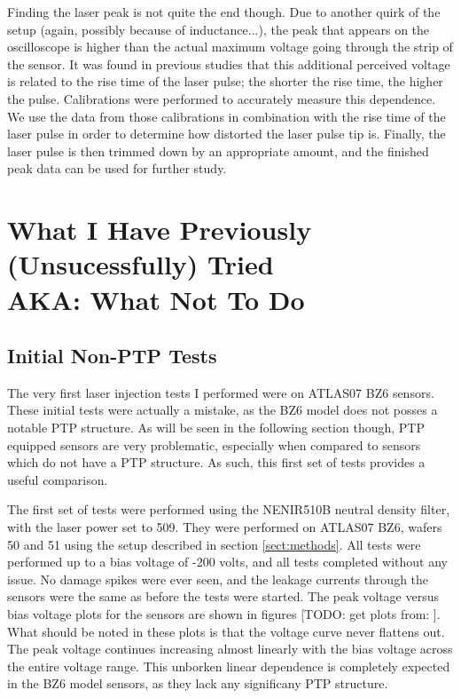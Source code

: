 \documentclass{report}
\begin{document}
            Finding the laser peak is not quite the end though. Due to another quirk of the setup (again, possibly because of inductance...), the peak that appears on the oscilloscope is higher than the actual maximum voltage going through the strip of the sensor. It was found in previous studies that this additional perceived voltage is related to the rise time of the laser pulse; the shorter the rise time, the higher the pulse. Calibrations were performed to accurately measure this dependence. We use the data from those calibrations in combination with the rise time of the laser pulse in order to determine how distorted the laser pulse tip is. Finally, the laser pulse is then trimmed down by an appropriate amount, and the finished peak data can be used for further study.

            



    \chapter{ What I Have Previously (Unsucessfully) Tried\\ AKA: What Not To Do }
        \section{Initial Non-PTP Tests}
            The very first laser injection tests I performed were on ATLAS07 BZ6 sensors. These initial tests were actually a mistake, as the BZ6 model does not posses a notable PTP structure. As will be seen in the following section though, PTP equipped sensors are very problematic, especially when compared to sensors which do not have a PTP structure. As such, this first set of tests provides a useful comparison.

            The first set of tests were performed using the NENIR510B neutral density filter, with the laser power set to 509. They were performed on ATLAS07 BZ6, wafers 50 and 51 using the setup described in section \ref{sect:methods}. All tests were performed up to a bias voltage of -200 volts, and all tests completed without any issue. No damage spikes were ever seen, and the leakage currents through the sensors were the same as before the tests were started. The peak voltage versus bias voltage plots for the sensors are shown in figures [TODO: get plots from:
            ]. What should be noted in these plots is that the voltage curve never flattens out. The peak voltage continues increasing almost linearly with the bias voltage across the entire voltage range. This unborken linear dependence is completely expected in the BZ6 model sensors, as they lack any significany PTP structure.
\end{document}
